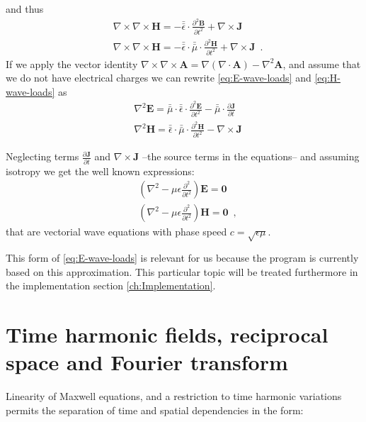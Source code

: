 and thus
\begin{align}
&\nabla\times\nabla\times \mathbf{H} = -\bar{\bar{\epsilon}}\cdot  \frac{\partial^2 \mathbf{B}}{\partial t^2} +  \nabla\times\mathbf{J} \nonumber \\
&\nabla\times\nabla\times \mathbf{H} = -\bar{\bar{\epsilon}}\cdot  \bar{\bar{\mu}}\cdot\frac{\partial^2 \mathbf{H}}{\partial t^2} + \nabla\times\mathbf{J} \label{eq:H-wave-loads} \enspace .
\end{align}
If we apply the vector identity $\nabla\times\nabla\times \mathbf{A} = \nabla(\nabla\cdot\mathbf{A}) - \nabla^2 \mathbf{A}$, and assume that we do not have electrical charges we can rewrite \eqref{eq:E-wave-loads} and \eqref{eq:H-wave-loads} as
\begin{align}
&\nabla^2 \mathbf{E} = \bar{\bar{\mu}}\cdot\bar{\bar{\epsilon}}\cdot \frac{\partial^2 \mathbf{E}}{\partial t^2} - \bar{\bar{\mu}}\cdot \frac{\partial \mathbf{J}}{\partial t} \\
&\nabla^2 \mathbf{H} = \bar{\bar{\epsilon}}\cdot\bar{\bar{\mu}}\cdot \frac{\partial^2 \mathbf{H}}{\partial t^2} - \nabla\times \mathbf{J}
\end{align}


Neglecting terms $\frac{\partial \mathbf{J}}{\partial t}$ and $\nabla\times \mathbf{J}$ --the source terms in the equations-- and assuming isotropy we get the well known expressions:
\begin{align}
&\left(\nabla^2 - \mu\epsilon \frac{\partial^2}{\partial t^2} \right) \mathbf{E} = \mathbf{0} \label{eq:E-wave-homo}\\
&\left(\nabla^2 - \mu\epsilon \frac{\partial^2}{\partial t^2} \right) \mathbf{H} = \mathbf{0} \label{eq:H-wave-homo} \enspace ,
\end{align}
that are vectorial wave equations with phase speed $c = \sqrt{\epsilon \mu}$. 

This form of \eqref{eq:E-wave-loads} is relevant for us because the program is currently based on this approximation. This particular topic will be treated furthermore in the implementation section \ref{ch:Implementation}.


\section{Time harmonic fields, reciprocal space and Fourier transform}

Linearity of Maxwell equations, and a restriction to time harmonic variations permits the separation of time and spatial dependencies in the form:

